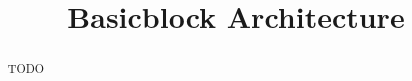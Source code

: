 \documentclass[pageno]{jpaper}
\begin{document}
\title{
Basicblock Architecture}

\date{}
\maketitle


\begin{abstract}
TODO
\end{abstract}


%




%



\end{document}

